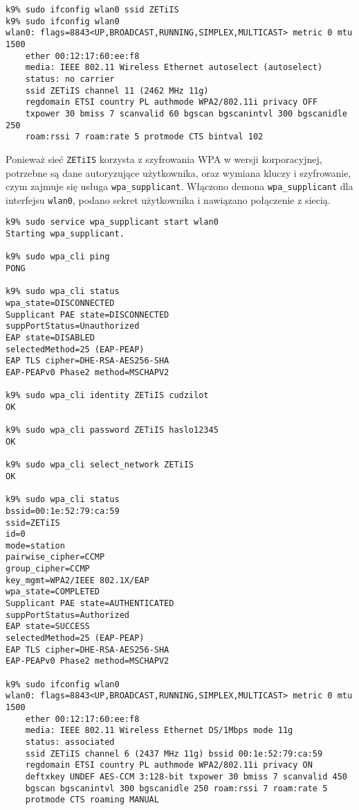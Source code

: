 \begin{lstlisting}
k9% sudo ifconfig wlan0 ssid ZETiIS
k9% sudo ifconfig wlan0
wlan0: flags=8843<UP,BROADCAST,RUNNING,SIMPLEX,MULTICAST> metric 0 mtu 1500
    ether 00:12:17:60:ee:f8
    media: IEEE 802.11 Wireless Ethernet autoselect (autoselect)
    status: no carrier
    ssid ZETiIS channel 11 (2462 MHz 11g)
    regdomain ETSI country PL authmode WPA2/802.11i privacy OFF
    txpower 30 bmiss 7 scanvalid 60 bgscan bgscanintvl 300 bgscanidle 250
    roam:rssi 7 roam:rate 5 protmode CTS bintval 102
\end{lstlisting}

Ponieważ sieć \texttt{ZETiIS} korzysta z szyfrowania WPA w wersji korporacyjnej,
potrzebne są dane autoryzujące użytkownika, oraz wymiana kluczy i szyfrowanie,
czym zajmuje się usługa \texttt{wpa\_supplicant}. Włączono demona
\texttt{wpa\_supplicant} dla interfejsu \texttt{wlan0}, podano sekret
użytkownika i nawiązano połączenie z siecią.

\begin{lstlisting}
k9% sudo service wpa_supplicant start wlan0
Starting wpa_supplicant.

k9% sudo wpa_cli ping
PONG

k9% sudo wpa_cli status
wpa_state=DISCONNECTED
Supplicant PAE state=DISCONNECTED
suppPortStatus=Unauthorized
EAP state=DISABLED
selectedMethod=25 (EAP-PEAP)
EAP TLS cipher=DHE-RSA-AES256-SHA
EAP-PEAPv0 Phase2 method=MSCHAPV2

k9% sudo wpa_cli identity ZETiIS cudzilot
OK

k9% sudo wpa_cli password ZETiIS haslo12345
OK

k9% sudo wpa_cli select_network ZETiIS
OK

k9% sudo wpa_cli status
bssid=00:1e:52:79:ca:59
ssid=ZETiIS
id=0
mode=station
pairwise_cipher=CCMP
group_cipher=CCMP
key_mgmt=WPA2/IEEE 802.1X/EAP
wpa_state=COMPLETED
Supplicant PAE state=AUTHENTICATED
suppPortStatus=Authorized
EAP state=SUCCESS
selectedMethod=25 (EAP-PEAP)
EAP TLS cipher=DHE-RSA-AES256-SHA
EAP-PEAPv0 Phase2 method=MSCHAPV2

k9% sudo ifconfig wlan0
wlan0: flags=8843<UP,BROADCAST,RUNNING,SIMPLEX,MULTICAST> metric 0 mtu 1500
    ether 00:12:17:60:ee:f8
    media: IEEE 802.11 Wireless Ethernet DS/1Mbps mode 11g
    status: associated
    ssid ZETiIS channel 6 (2437 MHz 11g) bssid 00:1e:52:79:ca:59
    regdomain ETSI country PL authmode WPA2/802.11i privacy ON
    deftxkey UNDEF AES-CCM 3:128-bit txpower 30 bmiss 7 scanvalid 450
    bgscan bgscanintvl 300 bgscanidle 250 roam:rssi 7 roam:rate 5
    protmode CTS roaming MANUAL
\end{lstlisting}

